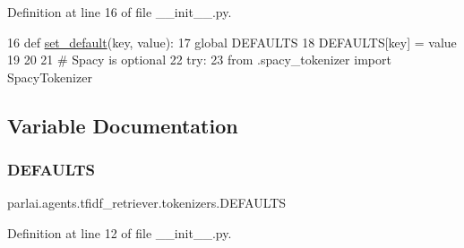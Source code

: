 Definition at line 16 of file \+\_\+\+\_\+init\+\_\+\+\_\+.\+py.


\begin{DoxyCode}
16 \textcolor{keyword}{def }\hyperlink{namespaceparlai_1_1agents_1_1tfidf__retriever_1_1tokenizers_aac1e43e3c08d0ea6279619797a56ba16}{set\_default}(key, value):
17     \textcolor{keyword}{global} DEFAULTS
18     DEFAULTS[key] = value
19 
20 
21 \textcolor{comment}{# Spacy is optional}
22 \textcolor{keywordflow}{try}:
23     \textcolor{keyword}{from} .spacy\_tokenizer \textcolor{keyword}{import} SpacyTokenizer
\end{DoxyCode}


\subsection{Variable Documentation}
\mbox{\label{namespaceparlai_1_1agents_1_1tfidf__retriever_1_1tokenizers_a481731228b5517a550cc272cad69474e}} 
\subsubsection{\texorpdfstring{D\+E\+F\+A\+U\+L\+TS}{DEFAULTS}}
{\footnotesize\ttfamily parlai.\+agents.\+tfidf\+\_\+retriever.\+tokenizers.\+D\+E\+F\+A\+U\+L\+TS}



Definition at line 12 of file \+\_\+\+\_\+init\+\_\+\+\_\+.\+py.


